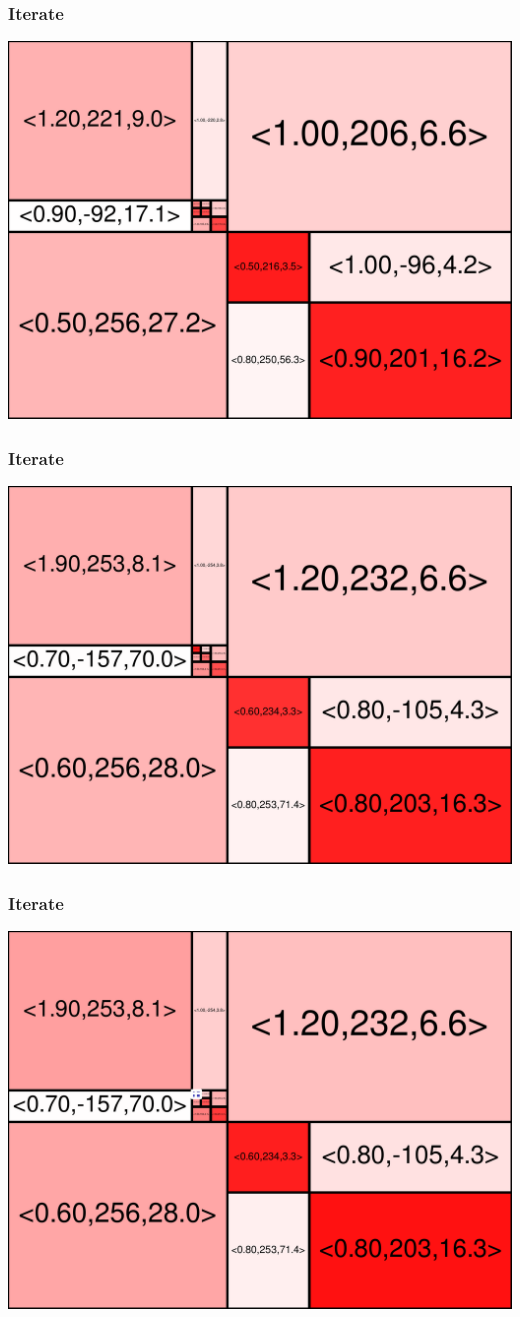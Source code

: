 \begin{frame}
\frametitle{Iterate}\begin{centering}\includegraphics[width=8.5 cm]{remy-graph/graph/test15.pdf}

\end{centering}\end{frame}


\begin{frame}
\frametitle{Iterate}\begin{centering}\includegraphics[width=8.5 cm]{remy-graph/graph/test16.pdf}

\end{centering}\end{frame}


\begin{frame}
\frametitle{Iterate}\begin{centering}\includegraphics[width=8.5 cm]{remy-graph/graph/test17.pdf}

\end{centering}\end{frame}


